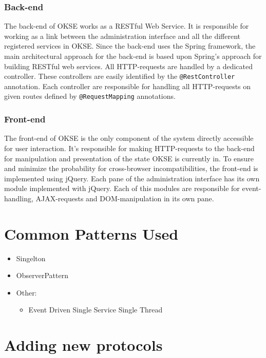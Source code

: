 \subsubsection{Back-end}

The back-end of OKSE works as a RESTful Web Service. It is responsible for working as a link between the administration interface and all the different registered services in OKSE. Since the back-end uses the Spring framework, the main architectural approach for the back-end is based upon Spring’s approach for building RESTful web services. All HTTP-requests are handled by a dedicated controller. These controllers are easily identified by the \verb!@RestController! annotation. Each controller are responsible for handling all HTTP-requests on given routes defined by \verb!@RequestMapping! annotations.  

\subsubsection{Front-end}

The front-end of OKSE is the only component of the system directly accessible for user interaction. It's responsible for making HTTP-requests to the back-end for manipulation and presentation of the state OKSE is currently in. To ensure and minimize the probability for cross-browser incompatibilities, the front-end is implemented using jQuery. Each pane of the administration interface has its own module implemented with jQuery. Each of this modules are responsible for event-handling, AJAX-requests and DOM-manipulation in its own pane.

\section{Common Patterns Used}
\label{sec:common-patterns-used}

\begin{itemize}
\item Singelton
\item ObserverPattern
\item Other: \begin{itemize}
\item Event Driven Single Service Single Thread
\end{itemize}
\end{itemize}

\section{Adding new protocols}
\label{sec:adding-new-protocols}

